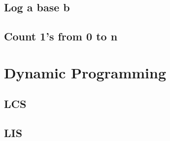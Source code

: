 \documentclass[10pt, a4paper]{article}
\begin{document}
\begin{multicols}{2}
\subsection{Log a base b}


\subsection{Count 1's from 0 to n}


\section{Dynamic Programming}
\subsection{LCS}


\subsection{LIS}


\end{multicols}
\end{document}
